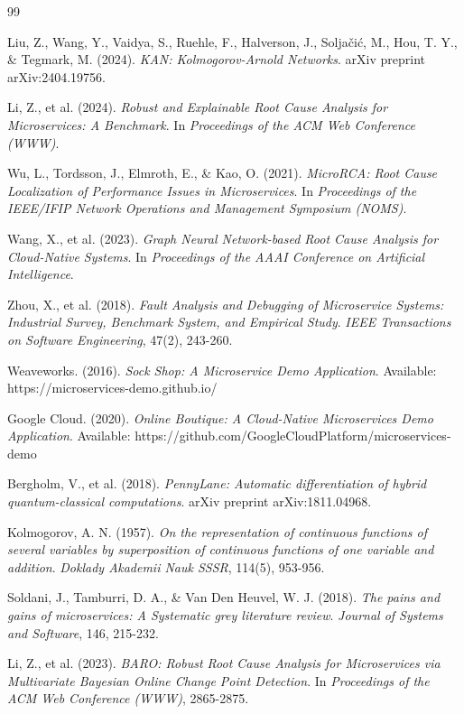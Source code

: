 \documentclass[10pt,a4paper,twocolumn]{article}
\begin{document}
\begin{thebibliography}{99}
\small

Liu, Z., Wang, Y., Vaidya, S., Ruehle, F., Halverson, J., Soljačić, M., Hou, T. Y., \& Tegmark, M. (2024).
\textit{KAN: Kolmogorov-Arnold Networks}.
arXiv preprint arXiv:2404.19756.

Li, Z., et al. (2024).
\textit{Robust and Explainable Root Cause Analysis for Microservices: A Benchmark}.
In \textit{Proceedings of the ACM Web Conference (WWW)}.

Wu, L., Tordsson, J., Elmroth, E., \& Kao, O. (2021).
\textit{MicroRCA: Root Cause Localization of Performance Issues in Microservices}.
In \textit{Proceedings of the IEEE/IFIP Network Operations and Management Symposium (NOMS)}.

Wang, X., et al. (2023).
\textit{Graph Neural Network-based Root Cause Analysis for Cloud-Native Systems}.
In \textit{Proceedings of the AAAI Conference on Artificial Intelligence}.

Zhou, X., et al. (2018).
\textit{Fault Analysis and Debugging of Microservice Systems: Industrial Survey, Benchmark System, and Empirical Study}.
\textit{IEEE Transactions on Software Engineering}, 47(2), 243-260.

Weaveworks. (2016).
\textit{Sock Shop: A Microservice Demo Application}.
Available: https://microservices-demo.github.io/

Google Cloud. (2020).
\textit{Online Boutique: A Cloud-Native Microservices Demo Application}.
Available: https://github.com/GoogleCloudPlatform/microservices-demo

Bergholm, V., et al. (2018).
\textit{PennyLane: Automatic differentiation of hybrid quantum-classical computations}.
arXiv preprint arXiv:1811.04968.

Kolmogorov, A. N. (1957).
\textit{On the representation of continuous functions of several variables by superposition of continuous functions of one variable and addition}.
\textit{Doklady Akademii Nauk SSSR}, 114(5), 953-956.

Soldani, J., Tamburri, D. A., \& Van Den Heuvel, W. J. (2018).
\textit{The pains and gains of microservices: A Systematic grey literature review}.
\textit{Journal of Systems and Software}, 146, 215-232.

Li, Z., et al. (2023).
\textit{BARO: Robust Root Cause Analysis for Microservices via Multivariate Bayesian Online Change Point Detection}.
In \textit{Proceedings of the ACM Web Conference (WWW)}, 2865-2875.


\end{thebibliography}
\end{document}
